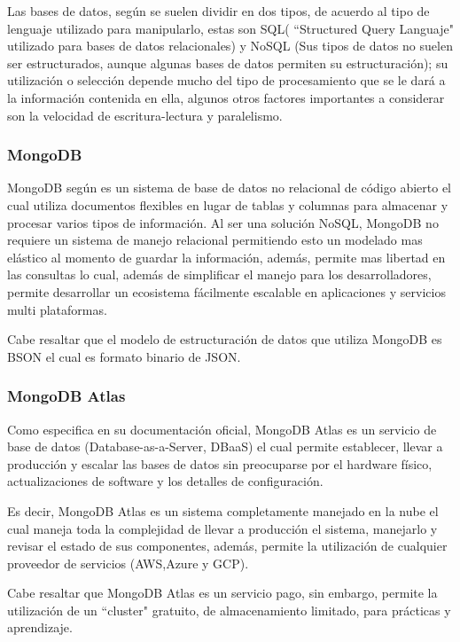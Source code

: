 Las bases de datos, según \textcite{bbddTipos} se suelen dividir en dos tipos, de
acuerdo al tipo de lenguaje
utilizado para manipularlo, estas son SQL( ``Structured Query Languaje" utilizado
para bases de datos relacionales) y NoSQL (Sus tipos de datos no suelen ser
estructurados, aunque algunas bases de datos permiten su estructuración); su
utilización o selección depende mucho del tipo de procesamiento que se le
dará a la información contenida en ella, algunos otros factores importantes
a considerar son la velocidad de escritura-lectura y paralelismo.

\subsubsection{MongoDB}
MongoDB según \textcite{MongoDB} es un sistema de base de datos no relacional de código
abierto el cual utiliza documentos flexibles en lugar de tablas y columnas para
almacenar y procesar varios tipos de información. Al ser una solución NoSQL,
MongoDB no requiere un sistema de manejo relacional permitiendo esto un modelado
mas elástico al momento de guardar la información, además, permite mas libertad
en las consultas lo cual, además de simplificar el manejo para los desarrolladores,
permite desarrollar un ecosistema fácilmente escalable en aplicaciones y servicios
multi plataformas.

Cabe resaltar que el modelo de estructuración de datos que utiliza MongoDB es
BSON el cual es formato binario de JSON.

\subsubsection{MongoDB Atlas}
Como \textcite{MongoDBAtlas} especifica en su documentación oficial, MongoDB Atlas
es un servicio de base de datos (Database-as-a-Server, DBaaS) el cual permite
establecer, llevar a producción y escalar las bases de datos sin preocuparse por
el hardware físico, actualizaciones de software y los detalles de configuración.

Es decir, MongoDB Atlas es un sistema completamente manejado en la nube el cual
maneja toda la complejidad de llevar a producción el sistema, manejarlo y revisar
el estado de sus componentes, además, permite la utilización de cualquier proveedor
de servicios (AWS,Azure y GCP).

Cabe resaltar que MongoDB Atlas es un servicio pago, sin embargo, permite la
utilización de un ``cluster" gratuito, de almacenamiento limitado, para
prácticas y aprendizaje.

